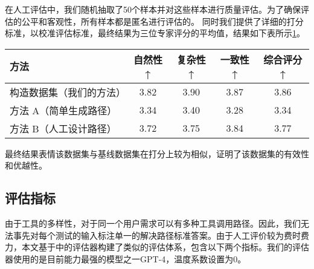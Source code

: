 在人工评估中，我们随机抽取了50个样本并对这些样本进行质量评估。为了确保评估的公平和客观性，所有样本都是匿名进行评估的。
同时我们提供了详细的打分标准，以校准评估标准，最终结果为三位专家评分的平均值，结果如下表所示\ref{tab:comparison}。

\begin{table}[h]
  \centering
  \label{tab:comparison}
  \begin{tabular}{l|c|c|c|c}
  \toprule
  \textbf{方法}               & \textbf{自然性↑} & \textbf{复杂性↑} & \textbf{一致性↑} & \textbf{综合评分↑} \\ \midrule
  构造数据集（我们的方法）   & 3.82             & 3.90             & 3.87             & 3.86              \\ \hline
  方法 A（简单生成路径）      & 3.34             & 3.40             & 3.28             & 3.34              \\ \hline
  方法 B（人工设计路径）      & 3.72             & 3.75             & 3.84             & 3.77              \\ 
  \bottomrule
  \end{tabular}
\end{table}

最终结果表情该数据集与基线数据集在打分上较为相似，证明了该数据集的有效性和优越性。

\subsection{评估指标}
由于工具的多样性，对于同一个用户需求可以有多种工具调用路径。因此，我们无法事先对每个测试的输入标注单一的解决路径标准答案。由于人工评价较为费时费力，本文基于\cite{Tang2023}中的评估器构建了类似的评估体系，包含以下两个指标。我们的评估器使用的是目前能力最强的模型之一GPT-4，温度系数设置为0。

